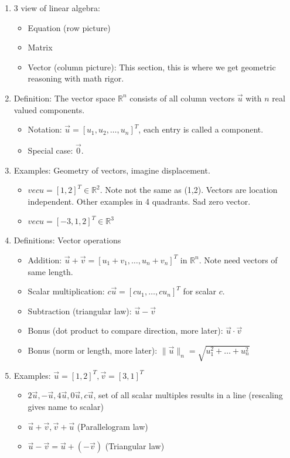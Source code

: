 \documentclass{article}
\begin{document}
\begin{enumerate}

\item 3 view of linear algebra:
\begin{itemize}
\item Equation (row picture)
\item Matrix 
\item Vector (column picture): This section, this is where we get geometric reasoning with math rigor.
\end{itemize}

\item Definition: The vector space $\mathbb{R}^n$ consists of all column vectors $\vec{u}$ with $n$ real valued components.
\begin{itemize}
\item Notation: $\vec{u} = [u_1, u_2, \dots, u_n]^T$, each entry is called a component.
\item Special case: $\vec{0}$.
\end{itemize}

\item Examples: Geometry of vectors, imagine displacement.
\begin{itemize}
\item $vec{u} = [1,2]^T \in \mathbb{R}^2$. Note not the same as (1,2). Vectors are location independent. Other examples in 4 quadrants. Sad zero vector.
\item $vec{u} = [-3,1,2]^T \in \mathbb{R}^3$
\end{itemize}

\item Definitions: Vector operations
\begin{itemize}
\item Addition: $\vec{u} + \vec{v} = [u_1+v_1, \dots, u_n+v_n]^T$ in $\mathbb{R}^n$. Note need vectors of same length.
\item Scalar multiplication: $c \vec{u} = [c u_1, \dots, c u_n]^T$ for scalar $c$.
\item Subtraction (triangular law): $\vec{u}-\vec{v}$
\item Bonus (dot product to compare direction, more later): $\vec{u} \cdot \vec{v}$
\item Bonus (norm or length, more later): $\| \vec{u} \|_n = \sqrt{u_1^2 + \dots + u_n^2}$
\end{itemize}

\item Examples: $\vec{u} = [1,2]^T, \vec{v} = [3,1]^T$
\begin{itemize}
\item $2\vec{u}, -\vec{u}, 4\vec{u}, 0\vec{u}, c\vec{u}$, set of all scalar multiples results in a line (rescaling gives name to scalar)
\item $\vec{u}+\vec{v}, \vec{v}+\vec{u}$ (Parallelogram law)
\item $\vec{u}-\vec{v} = \vec{u}+(-\vec{v})$ (Triangular law)
\end{itemize}


\end{enumerate}
\end{document}
